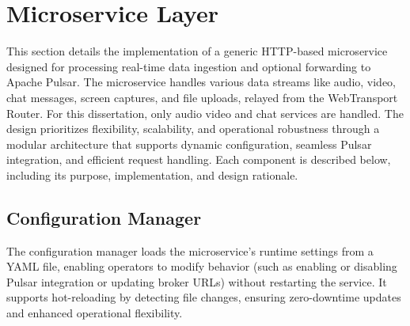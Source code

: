 




\section{Microservice Layer}
This section details the implementation of a generic HTTP-based microservice designed for processing real-time data ingestion and optional forwarding to Apache Pulsar. The microservice handles various data streams like audio, video, chat messages, screen captures, and file uploads, relayed from the WebTransport Router. For this dissertation, only audio video and chat services are handled. The design prioritizes flexibility, scalability, and operational robustness through a modular architecture that supports dynamic configuration, seamless Pulsar integration, and efficient request handling. Each component is described below, including its purpose, implementation, and design rationale.

\subsection{Configuration Manager}
The configuration manager loads the microservice’s runtime settings from a YAML file, enabling operators to modify behavior (such as enabling or disabling Pulsar integration or updating broker URLs) without restarting the service. It supports hot-reloading by detecting file changes, ensuring zero-downtime updates and enhanced operational flexibility.

